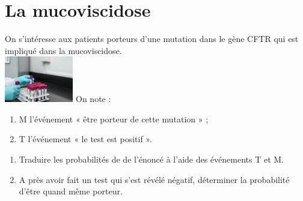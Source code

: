 \documentclass[a4paper,11pt,exos]{nsi} %
\begin{document}
\section*{La mucoviscidose}
On s'intéresse aux patients porteurs d'une mutation dans le gène CFTR qui est impliqué dans la mucoviscidose.\\[.5em]
{\includegraphics[width=3cm]{lab-3498584_640.jpg}}
On note :
\begin{enumerate}[label=\textbullet]
    \item M l'événement « être porteur de cette mutation » ;
    \item T l'événement « le test est positif ».
\end{enumerate}
\begin{enumerate}
    \item Traduire les probabilités de de l'énoncé à l'aide des événements T et M.
    \item A près avoir fait un test qui s'est révélé négatif, déterminer la probabilité d'être quand même porteur.
\end{enumerate}
\end{document}

